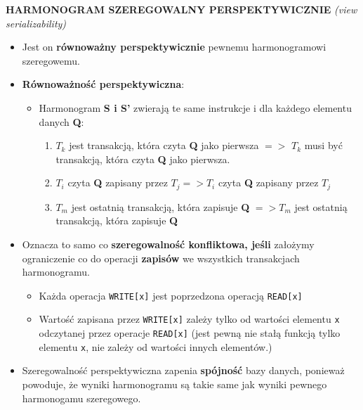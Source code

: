 \documentclass[a5paper,6pt]{article}
\begin{document}
    \textbf{HARMONOGRAM SZEREGOWALNY PERSPEKTYWICZNIE}
    \textit{(view serializability)}
    \begin{itemize}
        \item Jest on \textbf{równoważny perspektywicznie} pewnemu
        harmonogramowi szeregowemu.
        \item \textbf{Równoważność perspektywiczna}:
        \begin{itemize}
            \item Harmonogram \textbf{S i S'} zwierają te same instrukcje i dla
                  każdego elementu danych \textbf{Q}:
            \begin{enumerate}
                \item $T_k$ jest transakcją, która czyta \textbf{Q} jako
                      pierwsza $=>$ $T_k$ musi być transakcją, która czyta
                      \textbf{Q} jako pierwsza.
                \item $T_i$ czyta \textbf{Q} zapisany przez $T_j => T_i$ czyta
                      \textbf{Q} zapisany przez $T_j$
                \item $T_m$ jest ostatnią transakcją, która zapisuje \textbf{Q}
                      $=> T_m$ jest ostatnią transakcją, która zapisuje
                      \textbf{Q}
            \end{enumerate}
        \end{itemize}
        \item Oznacza to samo co \textbf{szeregowalność konfliktowa, jeśli}
              założymy ograniczenie co do operacji \textbf{zapisów} we
              wszystkich transakcjach harmonogramu.
        \begin{itemize}
            \item Każda operacja \texttt{WRITE[x]} jest poprzedzona operacją
                  \texttt{READ[x]}
            \item Wartość zapisana przez \texttt{WRITE[x]} zależy tylko od
                  wartości elementu \texttt{x} odczytanej przez operacje
                  \texttt{READ[x]} (jest pewną nie stałą funkcją tylko elementu
                  \texttt{x}, nie zależy od wartości innych elementów.)
        \end{itemize}

        \item Szeregowalność perspektywiczna zapenia \textbf{spójność} bazy
              danych, ponieważ powoduje, że wyniki harmonogramu są takie same
              jak wyniki pewnego harmonogamu szeregowego.
    \end{itemize}
\end{document}
